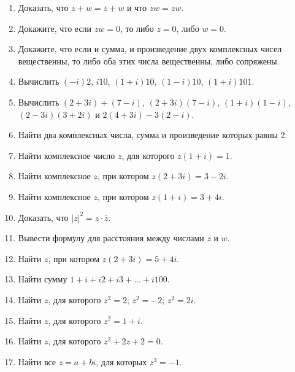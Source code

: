 \begin{enumerate}
\item Доказать, что $z + w = z + w$ и что $z w = z w$.
\item Докажите, что если $zw = 0$, то либо $z = 0$, либо $w = 0$.
\item Докажите, что если и сумма, и произведение двух комплексных чисел вещественны, то
либо оба этих числа вещественны, либо сопряжены.

\item Вычислить $(-i)2$, $i10$, $(1 + i)10$, $(1 - i)10$, $(1 + i)101$.
\item Вычислить $(2 + 3i) + (7 - i)$, $(2 + 3i)(7 - i)$, $(1 + i)(1 - i)$,
$(2 - 3i)(3 + 2i)$ и $2(4 + 3i) - 3(2 - i)$.
\item Найти два комплексных числа, сумма и произведение которых равны 2.
\item Найти комплексное число $z$, для которого $z(1 + i) = 1$.
\item Найти комплексное $z$, при котором $z(2 + 3i) = 3 - 2i$.
\item Найти комплексное $z$, при котором $z(1 + i) = 3 + 4i$.
\item Доказать, что $|z|^2 = z \cdot \bar z$.
\item Вывести формулу для расстояния между числами $z$ и $w$.

\item Найти $z$, при котором $z(2 + 3i) = 5 + 4i$.
\item Найти сумму $1 + i + i2 + i3 + \dots + i100$.
\item Найти $z$, для которого \ipunkt $z^2 = 2$; \ipunkt $z^2 = -2$; \ipunkt $z^2 = 2i$.
\item Найти $z$, для которого $z^2 = 1 + i$.
\item Найти $z$, для которого $z^2 + 2z + 2 = 0$.
\item Найти все $z = a + bi$, для которых $z^3 = -1$.

\end{enumerate}

